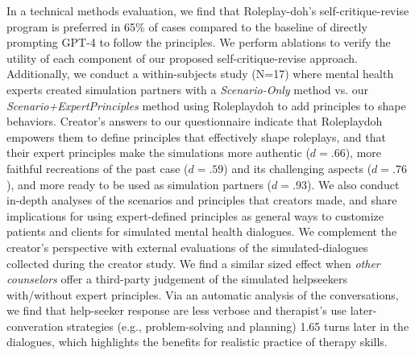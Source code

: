 
In a technical methods evaluation, we find that Roleplay-doh's self-critique-revise program is preferred in 65\% of cases compared to the baseline of directly prompting GPT-4 to follow the principles.  We perform ablations to verify the utility of each component of our proposed self-critique-revise approach. Additionally, we conduct a within-subjects study (N=17) where mental health experts created simulation partners with a \textit{Scenario-Only} method vs. our \textit{Scenario+ExpertPrinciples} method using Roleplaydoh to add principles to shape behaviors. Creator's answers to our questionnaire indicate that Roleplaydoh empowers them to define principles that effectively shape roleplays, and that their expert principles make the simulations more authentic ($d=.66$), more faithful recreations of the past case ($d=.59$) and its challenging aspects ($d=.76$), and more ready to be used as simulation partners ($d=.93$). We also conduct in-depth analyses of the scenarios and principles that creators made, and share implications for using expert-defined principles as general ways to customize patients and clients for simulated mental health dialogues.  
We complement the creator's perspective with external evaluations of the simulated-dialogues collected during the creator study. We find a similar sized effect when \textit{other counselors} offer a third-party judgement of the simulated helpseekers with/without expert principles. Via an automatic analysis of the conversations, we find that help-seeker response are less verbose and therapist's use later-converation strategies (e.g., problem-solving and planning) 1.65 turns later in the dialogues, which highlights the benefits for realistic practice of therapy skills.


